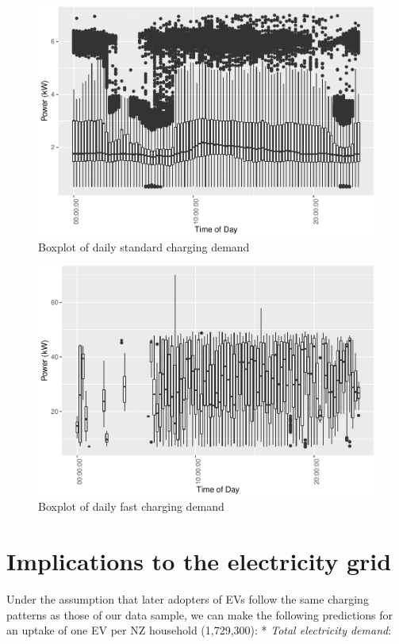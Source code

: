 \documentclass[]{article}
\begin{document}
\begin{figure}
\centering
\includegraphics{EVBB_report_files/figure-latex/boxplotCharging-1.pdf}
\caption{\label{fig:boxplotCharging}Boxplot of daily standard charging
demand}
\end{figure}

\begin{figure}
\centering
\includegraphics{EVBB_report_files/figure-latex/plot3-1.pdf}
\caption{\label{fig:plot3}Boxplot of daily fast charging demand}
\end{figure}

\section{Implications to the electricity
grid}\label{implications-to-the-electricity-grid}

Under the assumption that later adopters of EVs follow the same charging
patterns as those of our data sample, we can make the following
predictions for an uptake of one EV per NZ household (1,729,300): *
\emph{Total electricity demand}:
\end{document}
